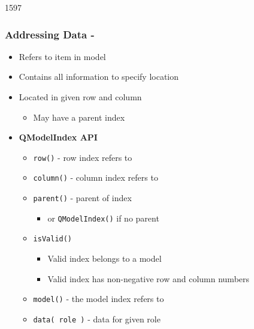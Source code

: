 \begin{slide}{1597}\frametitle{Addressing Data - }
  \begin{itemize}
  \item Refers to item in model
  \item Contains all information to specify location
  \item Located in given row and column
    \begin{itemize}
    \item May have a parent index
    \end{itemize}
    \medskip
  \item \textbf{QModelIndex API}
    \begin{itemize}
    \item \texttt{row()} - row index refers to
    \item \texttt{column()} - column index refers to
    \item \texttt{parent()} - parent of index
      \begin{itemize}
      \item or \texttt{QModelIndex()} if no parent
      \end{itemize}
    \item \texttt{isValid()}
      \begin{itemize}
      \item Valid index belongs to a model
      \item Valid index has non-negative row and column numbers
      \end{itemize}
    \item \texttt{model()} - the model index refers to
    \item \texttt{data( role )} - data for given role
    \end{itemize}
  \end{itemize}
\end{slide}

